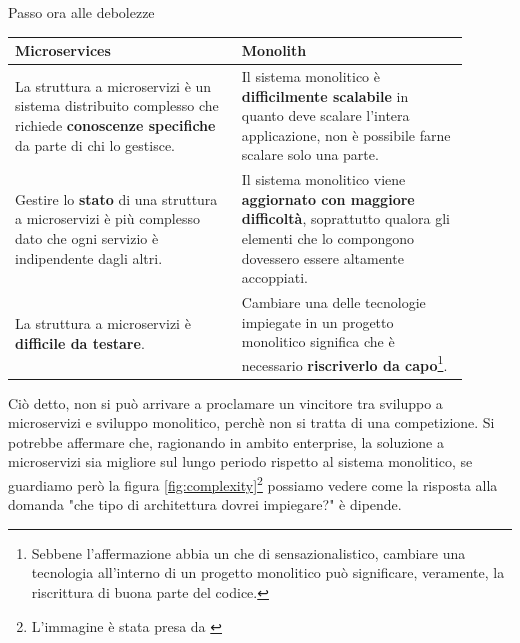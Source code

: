 Passo ora alle debolezze

\begin{center}
    \begin{tabular}{|p{0.45\linewidth}|p{0.45\linewidth}|}
    \hline
    \textbf{Microservices} & \textbf{Monolith}\\
    \hline
    \rowcolor{Red}
     La struttura a microservizi è un sistema distribuito complesso che richiede \textbf{conoscenze specifiche} da parte di chi lo gestisce. &  Il sistema monolitico è \textbf{difficilmente scalabile} in quanto deve scalare l'intera applicazione, non è possibile farne scalare solo una parte. \\
    \hline
    \rowcolor{LightRed}
     Gestire lo \textbf{stato} di una struttura a microservizi è più complesso dato che ogni servizio è indipendente dagli altri. & Il sistema monolitico viene \textbf{aggiornato con maggiore difficoltà}, soprattutto qualora gli elementi che lo compongono dovessero essere altamente accoppiati. \\
    \hline
    \rowcolor{LightRed}
    La struttura a microservizi è \textbf{difficile da testare}. & Cambiare una delle tecnologie impiegate in un progetto monolitico significa che è necessario \textbf{riscriverlo da capo}\footnote{
    Sebbene l'affermazione abbia un che di sensazionalistico, cambiare una tecnologia all'interno di un progetto monolitico può significare, veramente, la riscrittura di buona parte del codice.
    }. \\
    \hline
    \end{tabular}
\end{center}

Ciò detto, non si può arrivare a proclamare un vincitore tra sviluppo a microservizi e sviluppo monolitico, perchè non si tratta di una competizione. Si potrebbe affermare che, ragionando in ambito enterprise, la soluzione a microservizi sia migliore sul lungo periodo rispetto al sistema monolitico, se guardiamo però la figura \ref{fig:complexity}\footnote{L'immagine è stata presa da \cite{MartinFowlerDotCom}} possiamo vedere come la risposta alla domanda "che tipo di architettura dovrei impiegare?" è dipende.

